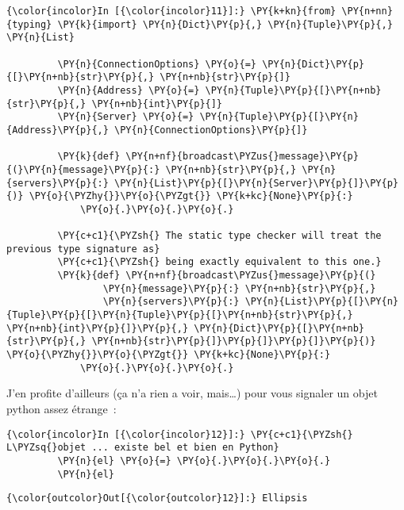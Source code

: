     \begin{Verbatim}[commandchars=\\\{\}]
{\color{incolor}In [{\color{incolor}11}]:} \PY{k+kn}{from} \PY{n+nn}{typing} \PY{k}{import} \PY{n}{Dict}\PY{p}{,} \PY{n}{Tuple}\PY{p}{,} \PY{n}{List}
         
         \PY{n}{ConnectionOptions} \PY{o}{=} \PY{n}{Dict}\PY{p}{[}\PY{n+nb}{str}\PY{p}{,} \PY{n+nb}{str}\PY{p}{]}
         \PY{n}{Address} \PY{o}{=} \PY{n}{Tuple}\PY{p}{[}\PY{n+nb}{str}\PY{p}{,} \PY{n+nb}{int}\PY{p}{]}
         \PY{n}{Server} \PY{o}{=} \PY{n}{Tuple}\PY{p}{[}\PY{n}{Address}\PY{p}{,} \PY{n}{ConnectionOptions}\PY{p}{]}
         
         \PY{k}{def} \PY{n+nf}{broadcast\PYZus{}message}\PY{p}{(}\PY{n}{message}\PY{p}{:} \PY{n+nb}{str}\PY{p}{,} \PY{n}{servers}\PY{p}{:} \PY{n}{List}\PY{p}{[}\PY{n}{Server}\PY{p}{]}\PY{p}{)} \PY{o}{\PYZhy{}}\PY{o}{\PYZgt{}} \PY{k+kc}{None}\PY{p}{:}
             \PY{o}{.}\PY{o}{.}\PY{o}{.}
         
         \PY{c+c1}{\PYZsh{} The static type checker will treat the previous type signature as}
         \PY{c+c1}{\PYZsh{} being exactly equivalent to this one.}
         \PY{k}{def} \PY{n+nf}{broadcast\PYZus{}message}\PY{p}{(}
                 \PY{n}{message}\PY{p}{:} \PY{n+nb}{str}\PY{p}{,}
                 \PY{n}{servers}\PY{p}{:} \PY{n}{List}\PY{p}{[}\PY{n}{Tuple}\PY{p}{[}\PY{n}{Tuple}\PY{p}{[}\PY{n+nb}{str}\PY{p}{,} \PY{n+nb}{int}\PY{p}{]}\PY{p}{,} \PY{n}{Dict}\PY{p}{[}\PY{n+nb}{str}\PY{p}{,} \PY{n+nb}{str}\PY{p}{]}\PY{p}{]}\PY{p}{]}\PY{p}{)} \PY{o}{\PYZhy{}}\PY{o}{\PYZgt{}} \PY{k+kc}{None}\PY{p}{:}
             \PY{o}{.}\PY{o}{.}\PY{o}{.}
\end{Verbatim}


    J'en profite d'ailleurs (ça n'a rien a voir, mais\ldots{}) pour vous
signaler un objet python assez étrange~:

    \begin{Verbatim}[commandchars=\\\{\}]
{\color{incolor}In [{\color{incolor}12}]:} \PY{c+c1}{\PYZsh{} L\PYZsq{}objet ... existe bel et bien en Python}
         \PY{n}{el} \PY{o}{=} \PY{o}{.}\PY{o}{.}\PY{o}{.}
         \PY{n}{el}
\end{Verbatim}


\begin{Verbatim}[commandchars=\\\{\}]
{\color{outcolor}Out[{\color{outcolor}12}]:} Ellipsis
\end{Verbatim}
            
